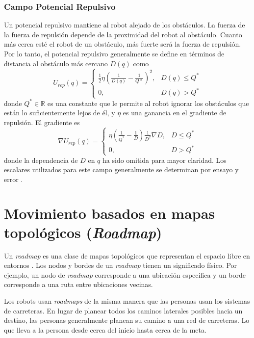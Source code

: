\subsubsection{Campo Potencial Repulsivo}
Un potencial repulsivo mantiene al robot alejado de los obst\'aculos. La fuerza de la fuerza de repulsi\'on depende de la proximidad del robot al obst\'aculo. Cuanto m\'as cerca est\'e el robot de un obst\'aculo, m\'as fuerte ser\'a la fuerza de repulsi\'on. Por lo tanto, el potencial repulsivo generalmente se define en t\'erminos de distancia al obst\'aculo m\'as cercano $D(q)$ como 
\begin{equation}
U_{rep}(q) =
\begin{cases}
	\frac{1}{2}\eta(\frac{1}{D(q)} - \frac{1}{Q*})^2, & D(q)\leq Q^* \\
	0, & D(q) > Q^*
\end{cases}
\label{eq:pot_rep}
\end{equation}
donde $Q^* \in \mathbb R$ es una constante que le permite al robot ignorar los obst\'aculos que est\'an lo suficientemente lejos de \'el, y $\eta$ es una ganancia en el gradiente de repulsi\'on. El gradiente es 
\begin{equation}
\nabla U_{rep}(q) =
\begin{cases}
	\eta(\frac{1}{Q^*} - \frac{1}{D})\frac{1}{D^2} \nabla D, & D \leq Q^* \\
	0, & D > Q^*
\end{cases}
\label{eqn:gradient_rep}
\end{equation}
donde la dependencia de $D$ en $q$ ha sido omitida para mayor claridad. Los escalares utilizados para este campo generalmente se determinan por ensayo y error \cite{choset2005principles}.

\section{Movimiento basados en mapas topol\'ogicos (\textit{Roadmap})}

Un \textit{roadmap} es una clase de mapas topol\'ogicos que representan el espacio libre en entornos \cite{choset2005principles}. Los nodos y bordes de un \textit{roadmap} tienen un significado f\'isico. Por ejemplo, un nodo de \textit{roadmap} corresponde a una ubicaci\'on espec\'ifica y un borde corresponde a una ruta entre ubicaciones vecinas.

Los robots usan \textit{roadmaps} de la misma manera que las personas usan los sistemas de carreteras. En lugar de planear todos los caminos laterales posibles hacia un destino, las personas generalmente planean su camino a una red de carreteras. Lo que lleva a la persona desde cerca del inicio hasta cerca de la meta.

